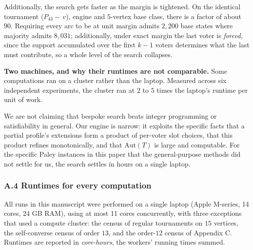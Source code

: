 \documentclass[
]{article}
\begin{document}
Additionally, the search gets faster as the margin is tightened. On the
identical tournament (\(P_{43} -\,v\)), engine and \(5\)-vertex base
class, there is a factor of about \(90\). Requiring every arc to be at
unit margin admits \(2{,}200\) base states where majority admits
\(8{,}031\); additionally, under exact margin the last voter is
\emph{forced}, since the support accumulated over the first \(k-1\)
voters determines what the last must contribute, so a whole level of the
search collapses.

\textbf{Two machines, and why their runtimes are not comparable.} Some
computations ran on a cluster rather than the laptop. Measured across
six independent experiments, the cluster ran at \(2\) to \(5\) times the
laptop's runtime per unit of work.

We are not claiming that bespoke search beats integer programming or
satisfiability in general. Our engine is narrow: it exploits the
specific facts that a partial profile's extensions form a product of
per-voter slot choices, that this product refines monotonically, and
that \(\mathrm{Aut}(T)\) is large and computable. For the specific Paley
instances in this paper that the general-purpose methods did not settle
for us, the search settles in hours on a single laptop.

\subsubsection{A.4 Runtimes for every
computation}\label{a.4-runtimes-for-every-computation}

All runs in this manuscript were performed on a single laptop (Apple
M-series, 14 cores, 24 GB RAM), using at most 11 cores concurrently,
with three exceptions that used a compute cluster: the census of regular
tournaments on \(15\) vertices, the self-converse census of order
\(13\), and the order-\(12\) census of Appendix C. Runtimes are reported
in \emph{core-hours}, the workers' running times summed.
\end{document}
